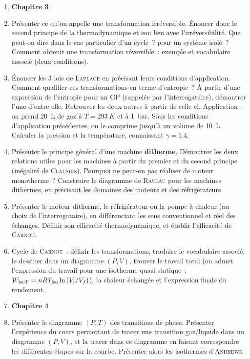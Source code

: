 \documentclass[a4paper, 12pt, final, garamond]{book}
\begin{document}
\begin{enumerate}[label=\sqenumi]
    \item[] \textbf{Chapitre 3}
    \item Présenter ce qu'on appelle une transformation irréversible. Énoncer
      donc le second principe de la thermodynamique et son lien avec
      l'irréversibilité. Que peut-on dire dans le cas particulier d'un cycle~?
      pour un système isolé~? Comment obtenir une transformation réversible~:
      exemple et vocabulaire associé (deux conditions).

    \item Énoncer les 3 lois de \textsc{Laplace} en précisant leurs conditions
      d'application. Comment qualifier ces transformations en terme d'entropie~?
      À partir d'une expression de l'entropie pour un GP (rappelée par
      l'interrogataire), démontrer l'une d'entre elle. Retrouver les deux autres
      à partir de celle-ci. Application~: on prend \SI{20}{L} de gaz à $T =
      \SI{293}{K}$ et à \SI{1}{bar}. Sous les conditions d'application
      précédentes, on le comprime jusqu'à un volume de \SI{10}{L}. Calculer la
      pression et la température, connaissant $\gamma = \num{1.4}$.

    \item Présenter le principe général d'une machine \textbf{ditherme}.
      Démontrer les deux relations utiles pour les machines à partir du premier
      et du second principe (inégalité de \textsc{Clausius}). Pourquoi ne
      peut-on pas réaliser de moteur monotherme~? Construire le diagramme de
      \textsc{Raveau} pour les machines dithermes, en précisant les domaines des
      moteurs et des réfrigérateurs.

    \item Présenter le moteur ditherme, le réfrigérateur ou la pompe à chaleur
      (au choix de l'interrogataire), en différenciant les sens conventionnel
      et réel des échanges. Définir son efficacité thermodynamique, et établir
      l'efficacité de \textsc{Carnot}.

    \item Cycle de \textsc{Carnot}~: définir les transformations, traduire le
      vocabulaire associé, le dessiner dans un diagramme $(P,V)$, trouver le
      travail total (on admet l'expression du travail pour une isotherme
      quasi-statique~: $W_{\rm isoT} = nRT_{\rm iso} \ln \left(
      V_{i}/V_{f} \right)$), la chaleur échangée et l'expression finale
      du rendement.

    \item[] \textbf{Chapitre 4}
    \item Présenter le diagramme $(P,T)$ des transitions de phase. Présenter
      l'expérience du cours permettant de tracer une transition gaz/liquide dans
      un diagramme $(P,V)$, et la tracer dans ce diagramme en faisant
      correspondre les différentes étapes sur la courbe. Présenter alors les
      isothermes d'\textsc{Andrews}.

\end{enumerate}
\vspace{-5pt}
\end{document}

